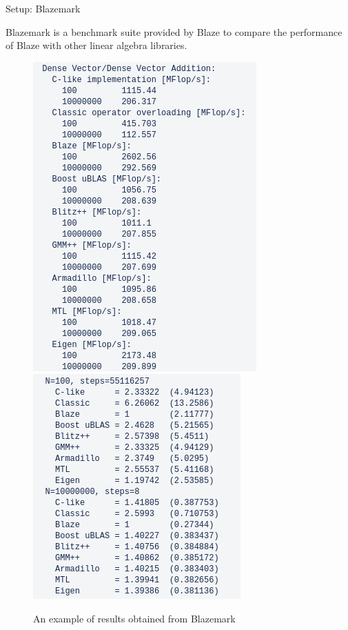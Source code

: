 \documentclass[10pt]{beamer}
\begin{document}
\begin{frame}{Setup: Blazemark}
	\begin{outline}
		Blazemark is a benchmark suite provided by Blaze to compare the performance of Blaze with other linear algebra libraries. 
		\begin{figure}
			\includegraphics[width=0.42\linewidth]{images/blazemark_1.png}
			\hfill\includegraphics[width=0.41\linewidth]{images/blazemark_2.png}
			\caption{An example of results obtained from Blazemark}	
		\end{figure}
	\end{outline}
\end{frame}
\end{document}
